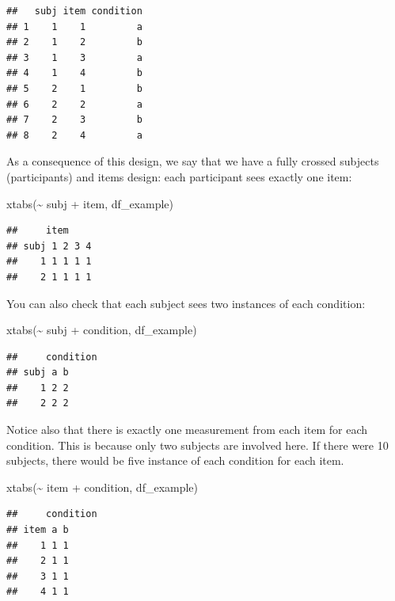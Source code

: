 \documentclass[
  12pt,
]{krantz}
\newenvironment{Shaded}{\begin{snugshade}}{\end{snugshade}}
\newcommand{\FunctionTok}[1]{\textcolor[rgb]{0.00,0.00,0.00}{#1}}
\newcommand{\NormalTok}[1]{#1}
\newcommand{\SpecialCharTok}[1]{\textcolor[rgb]{0.00,0.00,0.00}{#1}}
\theoremstyle{definition}
\theoremstyle{definition}
\theoremstyle{definition}
\theoremstyle{definition}
\theoremstyle{remark}
\begin{document}
\begin{verbatim}
##   subj item condition
## 1    1    1         a
## 2    1    2         b
## 3    1    3         a
## 4    1    4         b
## 5    2    1         b
## 6    2    2         a
## 7    2    3         b
## 8    2    4         a
\end{verbatim}

As a consequence of this design, we say that we have a fully crossed subjects (participants) and items design: each participant sees exactly one item:

\begin{Shaded}
\begin{Highlighting}[]
\FunctionTok{xtabs}\NormalTok{(}\SpecialCharTok{\textasciitilde{}}\NormalTok{ subj }\SpecialCharTok{+}\NormalTok{ item, df\_example)}
\end{Highlighting}
\end{Shaded}

\begin{verbatim}
##     item
## subj 1 2 3 4
##    1 1 1 1 1
##    2 1 1 1 1
\end{verbatim}

You can also check that each subject sees two instances of each condition:

\begin{Shaded}
\begin{Highlighting}[]
\FunctionTok{xtabs}\NormalTok{(}\SpecialCharTok{\textasciitilde{}}\NormalTok{ subj }\SpecialCharTok{+}\NormalTok{ condition, df\_example)}
\end{Highlighting}
\end{Shaded}

\begin{verbatim}
##     condition
## subj a b
##    1 2 2
##    2 2 2
\end{verbatim}

Notice also that there is exactly one measurement from each item for each condition. This is because only two subjects are involved here. If there were 10 subjects, there would be five instance of each condition for each item.

\begin{Shaded}
\begin{Highlighting}[]
\FunctionTok{xtabs}\NormalTok{(}\SpecialCharTok{\textasciitilde{}}\NormalTok{ item }\SpecialCharTok{+}\NormalTok{ condition, df\_example)}
\end{Highlighting}
\end{Shaded}

\begin{verbatim}
##     condition
## item a b
##    1 1 1
##    2 1 1
##    3 1 1
##    4 1 1
\end{verbatim}
\end{document}
